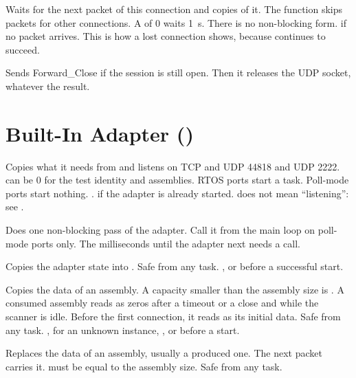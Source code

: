 Waits for the next \TO{} packet of this connection and copies
 of it. The function skips packets for other connections. A
 of 0 waits 1~s. There is no non-blocking form.
\ret {} if no packet arrives. This is how a lost
connection shows, because  continues to succeed.

Sends Forward\_Close if the session is still open. Then it releases the UDP
socket, whatever the result.

\section{Built-In Adapter ()}

Copies what it needs from  and listens on TCP and UDP 44818 and
UDP 2222.  can be 0 for the test identity and assemblies. RTOS
ports start a task. Poll-mode ports start nothing.
\ret {}.  if the adapter is already started.
 does not mean ``listening'': see .

Does one non-blocking pass of the adapter. Call it from the main loop on
poll-mode ports only.
\ret The milliseconds until the adapter next needs a call.

Copies the adapter state into . Safe from any task.
\ret {}, or  before a successful start.

Copies the data of an assembly. A capacity smaller than the assembly size is
. A consumed assembly reads as zeros after a timeout or
a close and while the scanner is idle. Before the first connection, it reads
as its initial data. Safe from any task.
\ret {},  for an unknown instance,
, or  before a start.

Replaces the data of an assembly, usually a produced one. The next \TO{}
packet carries it.  must be equal to the assembly size. Safe
from any task.

